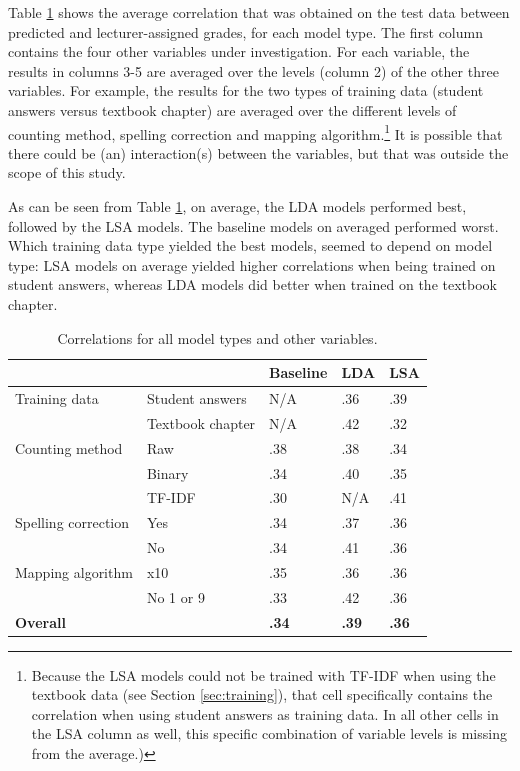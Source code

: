 \documentclass[a4paper,10pt,twoside]{article}
\begin{document}
Table \ref{table1} shows the average correlation that was obtained on the test data between predicted and lecturer-assigned grades, for each model type. The first column contains the four other variables under investigation. For each variable, the results in columns 3-5 are averaged over the levels (column 2) of the other three variables. For example, the results for the two types of training data (student answers versus textbook chapter) are averaged over the different levels of counting method, spelling correction and mapping algorithm.\footnote{Because the LSA models could not be trained with TF-IDF when using the textbook data (see Section \ref{sec:training}), that cell specifically contains the correlation when using student answers as training data. In all other cells in the LSA column as well, this specific combination of variable levels is missing from the average.) } It is possible that there could be (an) interaction(s) between the variables, but that was outside the scope of this study.

As can be seen from Table \ref{table1}, on average, the LDA models performed best, followed by the LSA models. The baseline models on averaged performed worst. Which training data type yielded the best models, seemed to depend on model type: LSA models on average yielded higher correlations when being trained on student answers, whereas LDA models did better when trained on the textbook chapter.

\begin{table}[h]
	\caption{Correlations for all model types and other variables.}
	\label{table1}
	\centering
	\begin{tabular}{lllll}
		\hline  &  & \textbf{Baseline} & \textbf{LDA} & \textbf{LSA} \\ 
		\hline  Training data & Student answers & N/A & .36 & .39 \\ 
		& Textbook chapter & N/A & .42 & .32 \\ 
		\hline  Counting method & Raw & .38 & .38 & .34 \\ 
		& Binary & .34 & .40 & .35 \\ 
		& TF-IDF & .30 & N/A & .41 \\ 
		\hline  Spelling correction & Yes & .34 & .37 & .36 \\ 
		& No & .34 & .41 & .36 \\ 
		\hline  Mapping algorithm & x10 & .35 & .36 & .36 \\ 
		& No 1 or 9 & .33 & .42 & .36 \\ 
		\hline  \textbf{Overall} &  & \textbf{.34} & \textbf{.39} & \textbf{.36} \\ 
		\hline 
	\end{tabular} 
\end{table}
\end{document}
